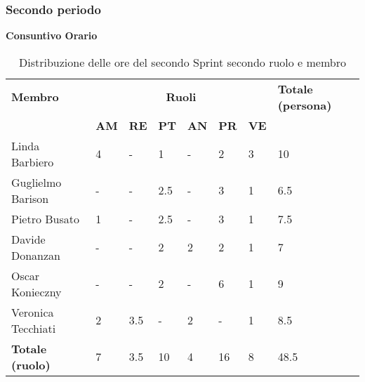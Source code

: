 \subsubsection{Secondo periodo}
\textbf{Consuntivo Orario}
\\
\begin{table}[ht!]
	\centering
	\begin{tabular}{p{4cm} p{1cm} p{1cm} p{1cm} p{1cm} p{1cm} p{1cm} p{3cm}}
		\toprule
        \textbf{Membro} & \multicolumn{6}{c}{\textbf{Ruoli}} & \textbf{Totale (persona)}\\
		& \textbf{AM} & \textbf{RE} & \textbf{PT} & \textbf{AN} & \textbf{PR} & \textbf{VE}\\
		\midrule
        Linda Barbiero          & 4     & -     & 1     & -     & 2     & 3   & 10 \\
        Guglielmo Barison       & -     & -     & 2.5     & -     & 3   & 1     & 6.5\\
        Pietro Busato           & 1     & -     & 2.5     & -     & 3   & 1     & 7.5 \\
        Davide Donanzan         & -     & -     & 2     & 2     & 2     & 1     & 7 \\
        Oscar Konieczny         & -   & -     & 2     & -     & 6     & 1     & 9 \\
        Veronica Tecchiati      & 2   & 3.5     & -     & 2     & -     & 1     & 8.5 \\
        \bottomrule
        \textbf{Totale (ruolo)} & 7    & 3.5     & 10     & 4   & 16     & 8   & 48.5 \\
	\end{tabular}
	\caption{Distribuzione delle ore del secondo Sprint secondo ruolo e membro}
	\label{table:Distribuzione delle ore consuntive del secondo Sprint secondo ruolo e membro}
\end{table}
\newpage
